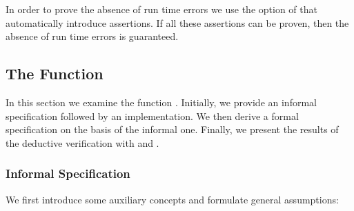 In order to prove the absence of run time errors we use
the  option of \wpframac that automatically introduce \acsl
assertions. If all these assertions can be proven, then
the absence of run time errors is guaranteed.


\subsection{The Function \peek}
\label{peek}


In this section we examine the function \peek.
Initially, we provide an informal specification 
followed by an implementation.
We then derive a formal specification on the basis of the informal one. 
Finally, we present the results of the deductive verification with \framac and \wpframac.


\subsubsection{Informal Specification}
\label{informal-peek}


We first introduce some auxiliary concepts and formulate general assumptions:

